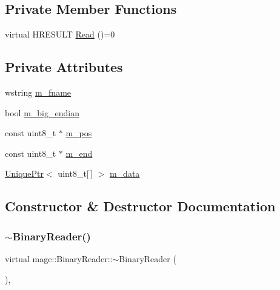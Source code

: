 \subsection*{Private Member Functions}
\begin{DoxyCompactItemize}
\item 
virtual H\+R\+E\+S\+U\+LT \hyperlink{classmage_1_1_binary_reader_a000cf97b640a5fbd1d5c33ccaae7fb39}{Read} ()=0
\end{DoxyCompactItemize}
\subsection*{Private Attributes}
\begin{DoxyCompactItemize}
\item 
wstring \hyperlink{classmage_1_1_binary_reader_a9c97c02d53ce60a9952751ad4f55414f}{m\+\_\+fname}
\item 
bool \hyperlink{classmage_1_1_binary_reader_a8d23fde958e08efe248edb5d92861113}{m\+\_\+big\+\_\+endian}
\item 
const uint8\+\_\+t $\ast$ \hyperlink{classmage_1_1_binary_reader_a086c8b8615dddb15a97acf657bb4d73b}{m\+\_\+pos}
\item 
const uint8\+\_\+t $\ast$ \hyperlink{classmage_1_1_binary_reader_a929b6480629014c24263ec3042b1f364}{m\+\_\+end}
\item 
\hyperlink{namespacemage_a8c307fbcc33bce9b7f2aa4c26c3b95cf}{Unique\+Ptr}$<$ uint8\+\_\+t\mbox{[}$\,$\mbox{]} $>$ \hyperlink{classmage_1_1_binary_reader_a34820a214a5b98e09beb12e8a465b0e3}{m\+\_\+data}
\end{DoxyCompactItemize}


\subsection{Constructor \& Destructor Documentation}
\hypertarget{classmage_1_1_binary_reader_aa300382cfa1585bb2f76c4e764bb5617}{}\label{classmage_1_1_binary_reader_aa300382cfa1585bb2f76c4e764bb5617} 
\subsubsection{\texorpdfstring{$\sim$\+Binary\+Reader()}{~BinaryReader()}}
{\footnotesize\ttfamily virtual mage\+::\+Binary\+Reader\+::$\sim$\+Binary\+Reader (\begin{DoxyParamCaption}{ }\end{DoxyParamCaption})\hspace{0.3cm}{\ttfamily [virtual]}, {\ttfamily [default]}}

